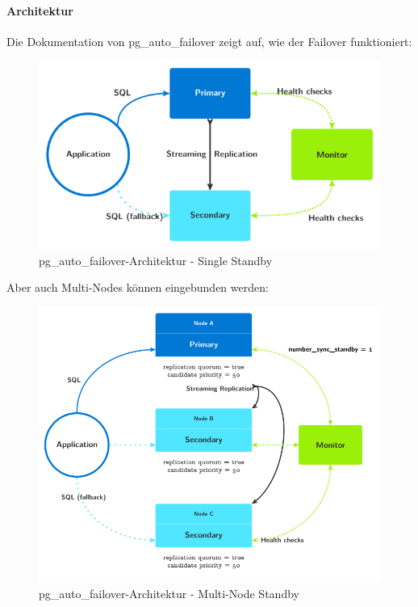 \begin{flushleft}
    \paragraph{Architektur}
    Die Dokumentation von pg\_auto\_failover \cite{PZZIZ5RT} zeigt auf, wie der Failover funktioniert:
    \begin{figure}[H]
        \centering
        \includegraphics[width=0.75\linewidth]{source/implementation/evaluation/postgresql_ha_solutions/pg_auto_failover/pg_auto-failover_arch-single-standby}
        \caption{pg\_auto\_failover-Architektur - Single Standby}
        \label{fig:pg_auto-failover_arch-single-standby}
    \end{figure}

    Aber auch Multi-Nodes können eingebunden werden\cite{4ZKBDG57}:
    \begin{figure}[H]
        \centering
        \includegraphics[width=0.75\linewidth]{source/implementation/evaluation/postgresql_ha_solutions/pg_auto_failover/pg_auto-failover_arch-multi-standby}
        \caption{pg\_auto\_failover-Architektur - Multi-Node Standby}
        \label{fig:pg_auto-failover_arch-multi-standby}
    \end{figure}


\end{flushleft}
